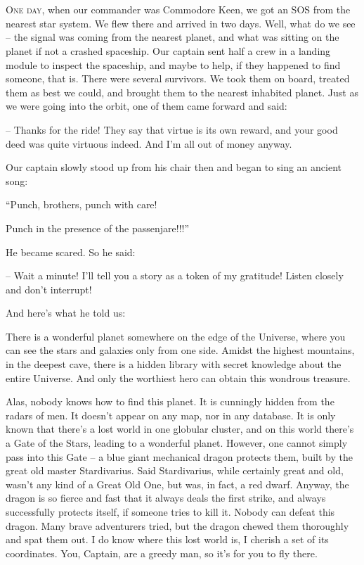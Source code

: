 \documentclass[ebook,oneside,final,openright]{memoir}
\begin{document}
\chapter{}
\par
\lettrine{O}{ne day,} when our commander was Commodore Keen, we got an SOS from the nearest star system. We flew there and arrived in two days. Well, what do we see – the signal was coming from the nearest planet, and what was sitting on the planet if not a crashed spaceship. Our captain sent half a crew in a landing module to inspect the spaceship, and maybe to help, if they happened to find someone, that is. There were several survivors. We took them on board, treated them as best we could, and brought them to the nearest inhabited planet. Just as we were going into the orbit, one of them came forward and said: \par
\par
– Thanks for the ride! They say that virtue is its own reward, and your good deed was quite virtuous indeed. And I’m all out of money anyway.\par
Our captain slowly stood up from his chair then and began to sing an ancient song: \par
“Punch, brothers, punch with care! \par
 Punch in the presence of the passenjare!!!” \par
He became scared. So he said:\par
– Wait a minute! I’ll tell you a story as a token of my gratitude! Listen closely and don’t interrupt! \par
 And here’s what he told us:\par
\par
 There is a wonderful planet somewhere on the edge of the Universe, where you can see the stars and galaxies only from one side. Amidst the highest mountains, in the deepest cave, there is a hidden library with secret knowledge about the entire Universe. And only the worthiest hero can obtain this wondrous treasure. \par
Alas, nobody knows how to find this planet. It is cunningly hidden from the radars of men. It doesn’t appear on any map, nor in any database. It is only known that there’s a lost world in one globular cluster, and on this world there’s a Gate of the Stars, leading to a wonderful planet. However, one cannot simply pass into this Gate – a blue giant mechanical dragon protects them, built by the great old master Stardivarius. Said Stardivarius, while certainly great and old, wasn’t any kind of a Great Old One, but was, in fact, a red dwarf. Anyway, the dragon is so fierce and fast that it always deals the first strike, and always successfully protects itself, if someone tries to kill it. Nobody can defeat this dragon. Many brave adventurers tried, but the dragon chewed them thoroughly and spat them out. I do know where this lost world is, I cherish a set of its coordinates. You, Captain, are a greedy man, so it’s for you to fly there.\par
\end{document}
